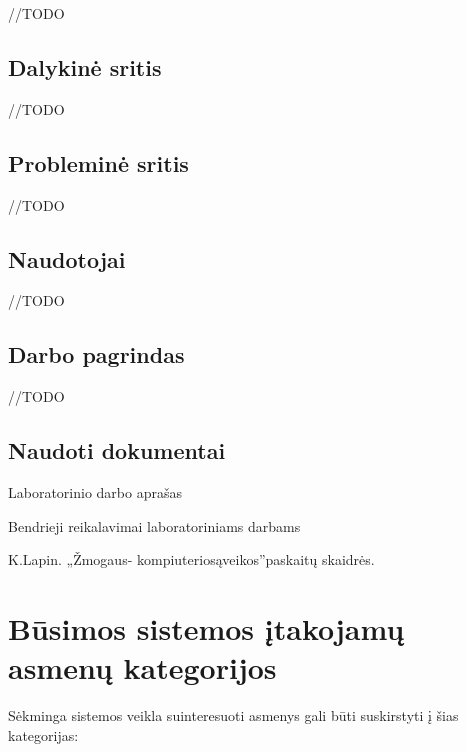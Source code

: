 \documentclass{VUMIFPSkursinis}
\begin{document}
//TODO


\subsection*{Dalykinė sritis}

//TODO


\subsection*{Probleminė sritis}

//TODO


\subsection*{Naudotojai}

//TODO


\subsection*{Darbo pagrindas}

//TODO

\subsection*{Naudoti dokumentai}

\begin{enumerate} [label = {[\arabic*]}]
	\item Laboratorinio darbo aprašas
	\item Bendrieji reikalavimai laboratoriniams darbams
	\item  K.Lapin. „Žmogaus- kompiuteriosąveikos”paskaitų skaidrės. 
\end{enumerate}

\section{Būsimos sistemos įtakojamų asmenų kategorijos}
Sėkminga sistemos veikla suinteresuoti asmenys gali būti suskirstyti į šias kategorijas:
\end{document}
